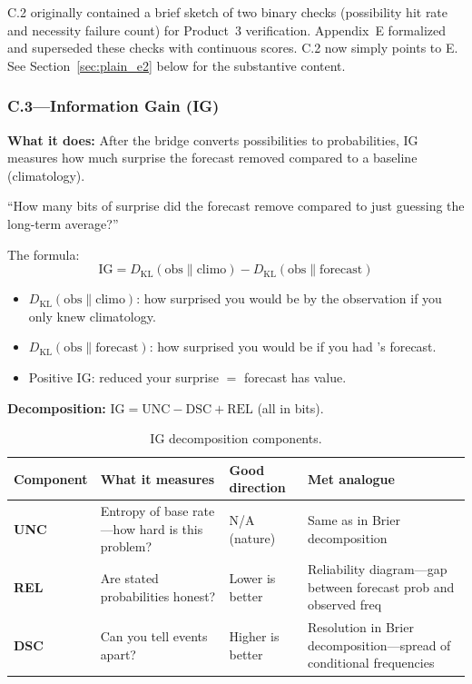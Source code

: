 C.2 originally contained a brief sketch of two binary checks (possibility hit rate and necessity failure count) for Product~3 verification. Appendix~E formalized and superseded these checks with continuous scores. C.2 now simply points to E. See Section~\ref{sec:plain_e2} below for the substantive content.

\subsubsection{C.3---Information Gain (IG)}\label{sec:plain_c3}

\textbf{What it does:} After the bridge converts possibilities to probabilities, IG measures how much surprise the forecast removed compared to a baseline (climatology).

``How many bits of surprise did the forecast remove compared to just guessing the long-term average?''

The formula:
\[
\mathrm{IG} = D_{\mathrm{KL}}(\text{obs} \| \text{climo}) - D_{\mathrm{KL}}(\text{obs} \| \text{forecast})
\]

\begin{itemize}[leftmargin=2em]
\item $D_{\mathrm{KL}}(\text{obs} \| \text{climo})$: how surprised you would be by the observation if you only knew climatology.
\item $D_{\mathrm{KL}}(\text{obs} \| \text{forecast})$: how surprised you would be if you had \clyfar{}'s forecast.
\item Positive $\mathrm{IG}$: \clyfar{} reduced your surprise $=$ forecast has value.
\end{itemize}

\textbf{Decomposition:} $\mathrm{IG} = \mathrm{UNC} - \mathrm{DSC} + \mathrm{REL}$ (all in bits).

\begin{table}[htbp]
\centering
\small
\caption{IG decomposition components.}
\label{tab:ig_decomposition}
\begin{tabularx}{\columnwidth}{l>{\raggedright\arraybackslash}p{}lX}
\toprule
Component & What it measures & Good direction & Met analogue \\
\midrule
\textbf{UNC} & Entropy of base rate---how hard is this problem? & N/A (nature) & Same as in Brier decomposition \\
\textbf{REL} & Are stated probabilities honest? & Lower is better & Reliability diagram---gap between forecast prob and observed freq \\
\textbf{DSC} & Can you tell events apart? & Higher is better & Resolution in Brier decomposition---spread of conditional frequencies \\
\bottomrule
\end{tabularx}
\end{table}

